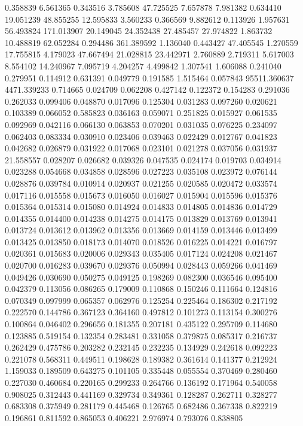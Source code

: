 0.358839
6.561365
0.343516
3.785608
47.725525
7.657878
7.981382
0.634410
19.051239
48.855255
12.595833
3.560233
0.366569
9.882612
0.113926
1.957631
56.493824
171.013907
20.149045
24.352438
27.485457
27.974822
1.863732
10.488819
62.052284
0.294486
361.389592
1.136040
0.443427
47.405545
1.270559
17.755815
4.179023
47.667494
21.028815
23.442971
2.760889
2.719311
5.617003
8.554102
14.240967
7.095719
4.204257
4.499842
1.307541
1.606088
0.241040
0.279951
0.114912
0.631391
0.049779
0.191585
1.515464
0.057843
95511.360637
4471.339233
0.714665
0.024709
0.062208
0.427142
0.122372
0.154283
0.291036
0.262033
0.099406
0.048870
0.017096
0.125304
0.031283
0.097260
0.020621
0.103389
0.066052
0.585823
0.036163
0.059071
0.251825
0.015927
0.061535
0.092969
0.042116
0.066130
0.063853
0.070201
0.031035
0.076225
0.234097
0.062403
0.083334
0.030910
0.023406
0.039463
0.022429
0.012767
0.041823
0.042682
0.026879
0.031922
0.017068
0.023101
0.021278
0.037056
0.031937
21.558557
0.028207
0.026682
0.039326
0.047535
0.024174
0.019703
0.034914
0.023288
0.054668
0.034858
0.028596
0.027223
0.035108
0.023972
0.076144
0.028876
0.039784
0.010914
0.020937
0.021255
0.020585
0.020472
0.033574
0.017116
0.015558
0.015673
0.016050
0.016027
0.015904
0.015596
0.015376
0.015364
0.015314
0.015080
0.014924
0.014833
0.014805
0.014836
0.014729
0.014355
0.014400
0.014238
0.014275
0.014175
0.013829
0.013769
0.013941
0.013724
0.013612
0.013962
0.013356
0.013669
0.014159
0.013446
0.013499
0.013425
0.013850
0.018173
0.014070
0.018526
0.016225
0.014221
0.016797
0.020361
0.015683
0.020006
0.029343
0.035405
0.017124
0.024208
0.021467
0.020700
0.016283
0.039670
0.029376
0.050994
0.028443
0.059266
0.041469
0.049426
0.030690
0.050275
0.049125
0.198269
0.082300
0.036546
0.095400
0.042379
0.113056
0.086265
0.179009
0.110868
0.150246
0.111664
0.124816
0.070349
0.097999
0.065357
0.062976
0.125254
0.225464
0.186302
0.217192
0.222570
0.144786
0.367123
0.364160
0.497812
0.101273
0.113154
0.300276
0.100864
0.046402
0.296656
0.181355
0.207181
0.435122
0.295709
0.114680
0.123885
0.519154
0.132354
0.283481
0.331058
0.379875
0.085317
0.216737
0.262429
0.475786
0.203282
0.232145
0.232235
0.134929
0.242618
0.092223
0.221078
0.568311
0.449511
0.198628
0.189382
0.361614
0.141377
0.212924
1.159033
0.189509
0.643275
0.101105
0.335448
0.055554
0.370469
0.280460
0.227030
0.460684
0.220165
0.299233
0.264766
0.136192
0.171964
0.540058
0.908025
0.312443
0.441169
0.329734
0.349361
0.128287
0.262711
0.328277
0.683308
0.375949
0.281179
0.445468
0.126765
0.682486
0.367338
0.822219
0.196861
0.811592
0.865053
0.406221
2.976974
0.793076
0.838805
